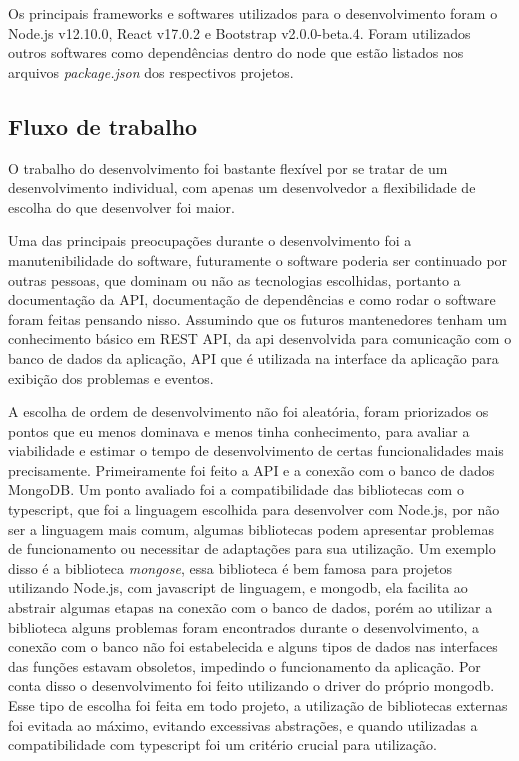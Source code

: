 Os principais frameworks e softwares utilizados para o desenvolvimento foram o Node.js v12.10.0,  React v17.0.2 e Bootstrap v2.0.0-beta.4. Foram utilizados outros softwares como dependências dentro do node que estão listados nos arquivos \textit{package.json} dos respectivos projetos.

\subsection{Fluxo de trabalho}

O trabalho do desenvolvimento foi bastante flexível por se tratar de um desenvolvimento individual, com apenas um desenvolvedor a flexibilidade de escolha do que desenvolver foi maior.

Uma das principais preocupações durante o desenvolvimento foi a manutenibilidade do software, futuramente o software poderia ser continuado por outras pessoas, que dominam ou não as tecnologias escolhidas, portanto a documentação da API, documentação de dependências e como rodar o software foram feitas pensando nisso. Assumindo que os futuros mantenedores tenham um conhecimento básico em REST API, da api desenvolvida para comunicação com o banco de dados da aplicação, API que é utilizada na interface da aplicação para exibição dos problemas e eventos.

A escolha de ordem de desenvolvimento não foi aleatória, foram priorizados os pontos que eu menos dominava e menos tinha conhecimento, para avaliar a viabilidade e estimar o tempo de desenvolvimento de certas funcionalidades mais precisamente. Primeiramente foi feito a API e a conexão com o banco de dados MongoDB. Um ponto avaliado foi a compatibilidade das bibliotecas com o typescript, que foi a linguagem escolhida para desenvolver com Node.js, por não ser a linguagem mais comum, algumas bibliotecas podem apresentar problemas de funcionamento ou necessitar de adaptações para sua utilização. Um exemplo disso é a biblioteca \textit{mongose}, essa biblioteca é bem famosa para projetos utilizando Node.js, com javascript de linguagem, e mongodb, ela facilita ao abstrair algumas etapas na conexão com o banco de dados, porém ao utilizar a biblioteca alguns problemas foram encontrados durante o desenvolvimento, a conexão com o banco não foi estabelecida e alguns tipos de dados nas interfaces das funções estavam obsoletos, impedindo o funcionamento da aplicação. Por conta disso o desenvolvimento foi feito utilizando o driver do próprio mongodb. Esse tipo de escolha foi feita em todo projeto, a utilização de bibliotecas externas foi evitada ao máximo, evitando excessivas abstrações, e quando utilizadas a compatibilidade com typescript foi um critério crucial para utilização.

